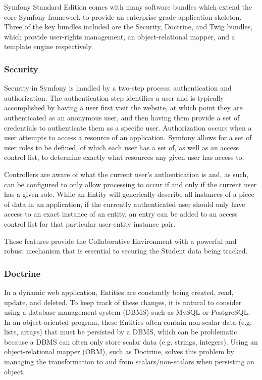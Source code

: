 \documentclass[letterpaper,12pt]{report}
\begin{document}
Symfony Standard Edition comes with many software bundles which extend the core Symfony framework to provide an enterprise-grade application skeleton. Three of the key bundles included are the Security, Doctrine, and Twig bundles, which provide user-rights management, an object-relational mapper, and a template engine respectively.

\subsubsection*{Security}

Security in Symfony is handled by a two-step process: authentication and authorization. The authentication step identifies a user and is typically accomplished by having a user first visit the website, at which point they are authenticated as an anonymous user, and then having them provide a set of credentials to authenticate them as a specific user. Authorization occurs when a user attempts to access a resource of an application. Symfony allows for a set of user roles to be defined, of which each user has a set of, as well as an access control list, to determine exactly what resources any given user has access to.

Controllers are aware of what the current user's authentication is and, as such, can be configured to only allow processing to occur if and only if the current user has a given role. While an Entity will generically describe all instances of a piece of data in an application, if the currently authenticated user should only have access to an exact instance of an entity, an entry can be added to an access control list for that particular user-entity instance pair.

These features provide the Collaborative Environment with a powerful and robust mechanism that is essential to securing the Student data being tracked.

\subsubsection*{Doctrine}

In a dynamic web application, Entities are constantly being created, read, update, and deleted. To keep track of these changes, it is natural to consider using a database management system (DBMS) such as MySQL or PostgreSQL. In an object-oriented program, these Entities often contain non-scalar data (e.g. lists, arrays) that must be persisted by a DBMS, which can be problematic because a DBMS can often only store scalar data (e.g. strings, integers). Using an object-relational mapper (ORM), such as Doctrine, solves this problem by managing the transformation to and from scalars/non-scalars when persisting an object.
\end{document}
